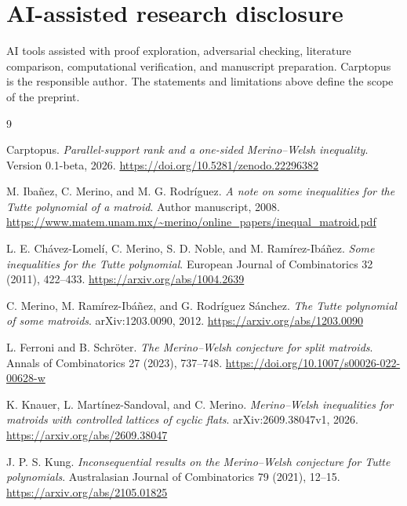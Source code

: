\documentclass[11pt]{article}
\begin{document}
\section*{AI-assisted research disclosure}

AI tools assisted with proof exploration, adversarial checking, literature comparison, computational verification, and manuscript preparation. Carptopus is the responsible author. The statements and limitations above define the scope of the preprint.

\begin{thebibliography}{9}
\small\raggedright

\hypertarget{ref1}{}Carptopus. \emph{Parallel-support rank and a one-sided Merino--Welsh inequality}. Version 0.1-beta, 2026. \url{https://doi.org/10.5281/zenodo.22296382}

\hypertarget{ref2}{}M. Ibañez, C. Merino, and M. G. Rodríguez. \emph{A note on some inequalities for the Tutte polynomial of a matroid}. Author manuscript, 2008. \url{https://www.matem.unam.mx/~merino/online_papers/inequal_matroid.pdf}

\hypertarget{ref3}{}L. E. Chávez-Lomelí, C. Merino, S. D. Noble, and M. Ramírez-Ibáñez. \emph{Some inequalities for the Tutte polynomial}. European Journal of Combinatorics 32 (2011), 422--433. \url{https://arxiv.org/abs/1004.2639}

\hypertarget{ref4}{}C. Merino, M. Ramírez-Ibáñez, and G. Rodríguez Sánchez. \emph{The Tutte polynomial of some matroids}. arXiv:1203.0090, 2012. \url{https://arxiv.org/abs/1203.0090}

\hypertarget{ref5}{}L. Ferroni and B. Schröter. \emph{The Merino--Welsh conjecture for split matroids}. Annals of Combinatorics 27 (2023), 737--748. \url{https://doi.org/10.1007/s00026-022-00628-w}

\hypertarget{ref6}{}K. Knauer, L. Martínez-Sandoval, and C. Merino. \emph{Merino--Welsh inequalities for matroids with controlled lattices of cyclic flats}. arXiv:2609.38047v1, 2026. \url{https://arxiv.org/abs/2609.38047}

\hypertarget{ref7}{}J. P. S. Kung. \emph{Inconsequential results on the Merino--Welsh conjecture for Tutte polynomials}. Australasian Journal of Combinatorics 79 (2021), 12--15. \url{https://arxiv.org/abs/2105.01825}
\end{thebibliography}
\end{document}
